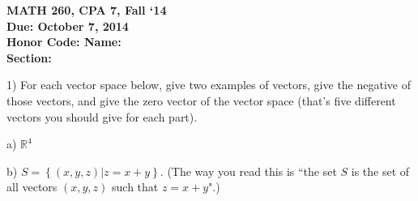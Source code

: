 \documentclass{article}
\begin{document}
\begin{flushleft}
	\bfseries{MATH 260, CPA 7, Fall `14}\\
	\bfseries{Due: October 7, 2014}\\
	\bfseries{Honor Code:} \hspace{3.5in}\bfseries{Name:}\\
	\hspace{4.37in}\bfseries{Section:}
\end{flushleft}
\vspace{.25in}
\begin{flushleft}

1) For each vector space below, give two examples of vectors, give the negative of those vectors, and give the zero vector of the vector space (that's five different vectors you should give for each part).

\vspace{0.2in}

a) $\mathbb{R}^4$

\vspace{3in}

b) $S=\left\{ (x,y,z)| z = x + y \right\}$.  (The way you read this is ``the set $S$ is the set of all vectors $(x,y,z)$ such that $z = x + y$".)

\end{flushleft}
\end{document}
